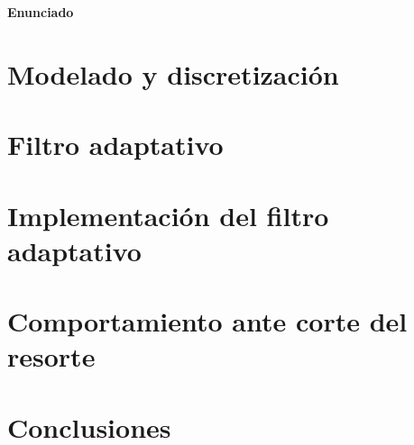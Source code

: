 \documentclass[10pt,a4paper]{article}
\begin{document}
		
	\setcounter{page}{1}

\begin{center}{\Large{\textbf{Enunciado}}}\end{center}
%	

	
	
	\section{Modelado y discretización}\label{sec:ej1}
	
		
	\section{Filtro adaptativo}\label{sec:ej2}
	

	\section{Implementación del filtro adaptativo}\label{sec:ej3}
		


	\pagebreak
	\section{Comportamiento ante corte del resorte}\label{sec:ej4}
		

	\pagebreak
	\label{sec:ej5}
		

	\section{Conclusiones}\label{sec:conclusiones}
		

\end{document}
